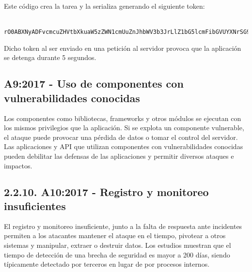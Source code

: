Este código crea la tarea y la serializa generando el siguiente token:

\begin{verbatim}
    rO0ABXNyADFvcmcuZHVtbXkuaW5zZWN1cmUuZnJhbWV3b3JrLlZ1bG5lcmFibGVUYXNrSG9sZGVyAAAAAAAAAAICAANMABZyZXF1ZXN0ZWRFeGVjdXRpb25UaW1ldAAZTGphdmEvdGltZS9Mb2NhbERhdGVUaW1lO0wACnRhc2tBY3Rpb250ABJMamF2YS9sYW5nL1N0cmluZztMAAh0YXNrTmFtZXEAfgACeHBzcgANamF2YS50aW1lLlNlcpVdhLobIkiyDAAAeHB3DgUAAAflBgYSCgML+WfAeHQAB3NsZWVwIDV0AAZteVRhc2s=
\end{verbatim}

Dicho token al ser enviado en una petición al servidor provoca que la aplicación se detenga durante 5 segundos.

\subsection{A9:2017 - Uso de componentes con vulnerabilidades conocidas}

Los componentes como bibliotecas, frameworks y otros módulos se ejecutan con los mismos
privilegios que la aplicación. Si se explota un componente vulnerable, el ataque puede provocar
una pérdida de datos o tomar el control del servidor. Las aplicaciones y API que utilizan
componentes con vulnerabilidades conocidas pueden debilitar las defensas de las aplicaciones y
permitir diversos ataques e impactos.

\subsection{2.2.10. A10:2017 - Registro y monitoreo insuficientes}

El registro y monitoreo insuficiente, junto a la falta de respuesta ante incidentes permiten a los
atacantes mantener el ataque en el tiempo, pivotear a otros sistemas y manipular, extraer o
destruir datos. Los estudios muestran que el tiempo de detección de una brecha de seguridad es
mayor a 200 días, siendo típicamente detectado por terceros en lugar de por procesos internos. 



